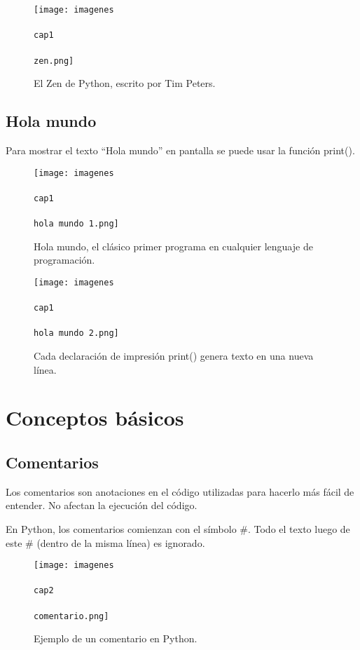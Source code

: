 \documentclass{article}
\newcommand{\doble}[1]{``#1''}
\begin{document}
\begin{figure}[ht!]
  \texttt{[image: imagenes\\\\cap1\\\\zen.png]}
  \caption{El Zen de Python, escrito por Tim Peters.}
\end{figure}

\subsection{Hola mundo}

Para mostrar el texto \doble{Hola mundo} en pantalla se puede usar la función print().

\begin{figure}[ht!]
  \texttt{[image: imagenes\\\\cap1\\\\hola mundo 1.png]}
  \caption{Hola mundo, el clásico primer programa en cualquier lenguaje de programación.}
\end{figure}

\begin{figure}[ht!]
  \texttt{[image: imagenes\\\\cap1\\\\hola mundo 2.png]}
  \caption{Cada declaración de impresión print() genera texto en una nueva línea.}
\end{figure}

\newpage
\section{Conceptos básicos}

\subsection{Comentarios}

Los comentarios son anotaciones en el código utilizadas para hacerlo más fácil de entender. No afectan la ejecución del código.

En Python, los comentarios comienzan con el símbolo \#. Todo el texto luego de este \# (dentro de la misma línea) es ignorado.

\begin{figure}[ht!]
  \texttt{[image: imagenes\\\\cap2\\\\comentario.png]}
  \caption{Ejemplo de un comentario en Python.}
\end{figure}
\end{document}
